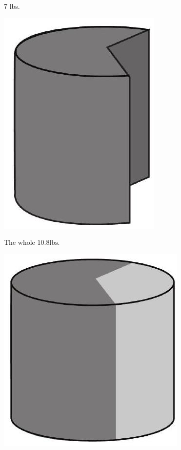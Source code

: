 \documentclass[10pt]{article}
\begin{document}
7 lbs.

\includegraphics[max width=\textwidth]{2022_09_11_72dbedc910e6e984560cg-31}

The whole $10.8 \mathrm{lbs}$.

\includegraphics[max width=\textwidth]{2022_09_11_72dbedc910e6e984560cg-31(1)}
\end{document}
